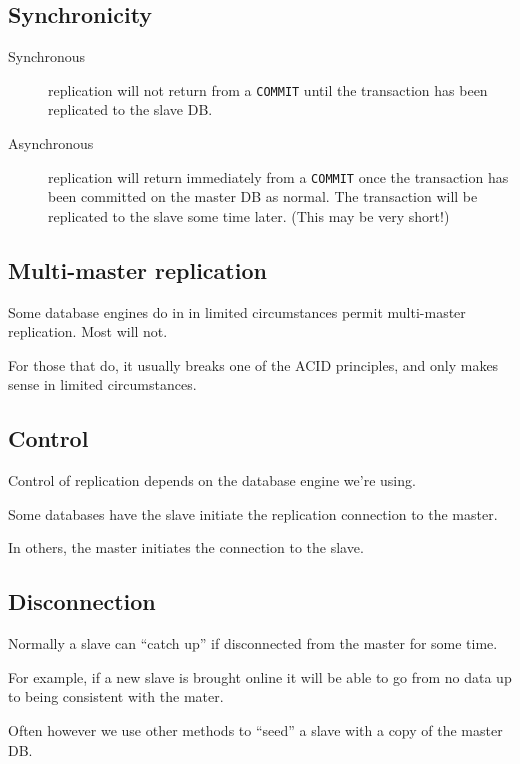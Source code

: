 \documentclass[slides]{pgnotes}
\begin{document}
\subsection{Synchronicity}

\begin{description}
\item[Synchronous] replication will not return from a \texttt{COMMIT} until the transaction has been replicated to the slave DB.
\item[Asynchronous] replication will return immediately from a \texttt{COMMIT} once the transaction has been committed on the master DB as normal. The transaction will be replicated to the slave some time later. (This may be very short!)
\end{description}


\subsection{Multi-master replication}

Some database engines do in in limited circumstances permit multi-master replication.
Most will not.

For those that do, it usually breaks one of the ACID principles, and only makes sense in limited circumstances.

\subsection{Control}

Control of replication depends on the database engine we're using.

Some databases have the slave initiate the replication connection to the master.

In others, the master initiates the connection to the slave.

\subsection{Disconnection}

Normally a slave can ``catch up'' if disconnected from the master for some time.

For example, if a new slave is brought online it will be able to go from no data up to being consistent with the mater.

Often however we use other methods to ``seed'' a slave with a copy of the master DB.

\newpage
\end{document}
